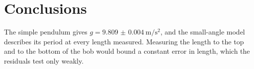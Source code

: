 \chapter{Conclusions}
\label{ch:conclusions}

The simple pendulum gives $g = \qty{9.809(4)}{\metre\per\second\squared}$, and the small-angle model describes its period at every length measured. Measuring the length to the top and to the bottom of the bob would bound a constant error in length, which the residuals test only weakly.
